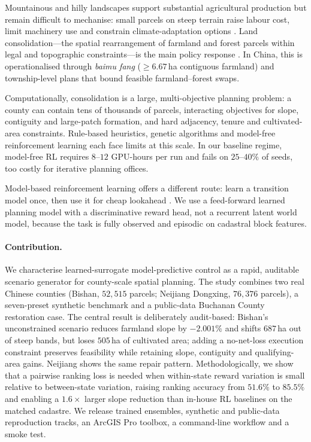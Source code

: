\documentclass[11pt]{article}
\begin{document}
Mountainous and hilly landscapes support substantial agricultural production but remain difficult to mechanise: small parcels on steep terrain raise labour cost, limit machinery use and constrain climate-adaptation options \citep{romeo2020fao,liu2023fragmentation,niu2023fragmentation,foley2011solutions,springmann2018options}. Land consolidation---the spatial rearrangement of farmland and forest parcels within legal and topographic constraints---is the main policy response \citep{liu2014land,long2014rural,rounsevell2014challenges}. In China, this is operationalised through \textit{baimu fang} ($\geq 6.67$\,ha contiguous farmland) and township-level plans that bound feasible farmland--forest swaps.

Computationally, consolidation is a large, multi-objective planning problem: a county can contain tens of thousands of parcels, interacting objectives for slope, contiguity and large-patch formation, and hard adjacency, tenure and cultivated-area constraints. Rule-based heuristics, genetic algorithms \citep{cao2012boundary,deb2002fast,stewart2004multi,aerts2002using} and model-free reinforcement learning \citep{zheng2023urban,equihua2024connectivity,janowicz2020geoai} each face limits at this scale. In our baseline regime, model-free RL requires $8$--$12$ GPU-hours per run and fails on $25$--$40\%$ of seeds, too costly for iterative planning offices.

Model-based reinforcement learning offers a different route: learn a transition model once, then use it for cheap lookahead \citep{chua2018deep,janner2019trust}. We use a feed-forward learned planning model with a discriminative reward head, not a recurrent latent world model, because the task is fully observed and episodic on cadastral block features.

\paragraph{Contribution.} We characterise learned-surrogate model-predictive control as a rapid, auditable scenario generator for county-scale spatial planning. The study combines two real Chinese counties (Bishan, $52{,}515$ parcels; Neijiang Dongxing, $76{,}376$ parcels), a seven-preset synthetic benchmark and a public-data Buchanan County restoration case. The central result is deliberately audit-based: Bishan's unconstrained scenario reduces farmland slope by $-2.001\%$ and shifts $687$\,ha out of steep bands, but loses $505$\,ha of cultivated area; adding a no-net-loss execution constraint preserves feasibility while retaining slope, contiguity and qualifying-area gains. Neijiang shows the same repair pattern. Methodologically, we show that a pairwise ranking loss is needed when within-state reward variation is small relative to between-state variation, raising ranking accuracy from $51.6\%$ to $85.5\%$ and enabling a $1.6\times$ larger slope reduction than in-house RL baselines on the matched cadastre. We release trained ensembles, synthetic and public-data reproduction tracks, an ArcGIS Pro toolbox, a command-line workflow and a smoke test.
\end{document}
